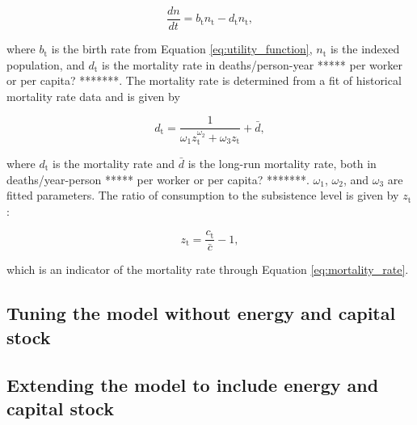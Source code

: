 \documentclass[letterpaper,12pt]{article}
\begin{document}
\begin{equation} \label{eq:dn_dt}
	\frac{dn}{dt} = b_\mathrm{t} n_\mathrm{t} - d_\mathrm{t} n_\mathrm{t},
\end{equation}

\noindent where $b_\mathrm{t}$ is the birth rate from Equation \ref{eq:utility_function}, $n_\mathrm{t}$ is the indexed population, and $d_\mathrm{t}$ is the mortality rate in deaths/person-year ***** per worker or per capita? *******. The mortality rate is determined from a fit of historical mortality rate data \citep{Jones:2001wn} and is given by

\begin{equation} \label{eq:mortality_rate}
	d_\mathrm{t} = \frac{1}{\omega_\mathrm{1} z_\mathrm{t}^{\omega_\mathrm{2}} + \omega_\mathrm{3} z_\mathrm{t}} + \bar d,
\end{equation}

\noindent where $d_\mathrm{t}$ is the mortality rate and $\bar d$ is the long-run mortality rate, both in deaths/year-person ***** per worker or per capita? *******. $\omega_\mathrm{1}$, $\omega_\mathrm{2}$, and $\omega_\mathrm{3}$ are fitted parameters. The ratio of consumption to the subsistence level is given by $z_\mathrm{t}$:

\begin{equation} \label{eq:z}
	z_\mathrm{t} = \frac{c_\mathrm{t}}{\bar c} - 1, 
\end{equation}

\noindent which is an indicator of the mortality rate through Equation \ref{eq:mortality_rate}.

\subsection{Tuning the model without energy and capital stock}

\subsection{Extending the model to include energy and capital stock}
\end{document}
